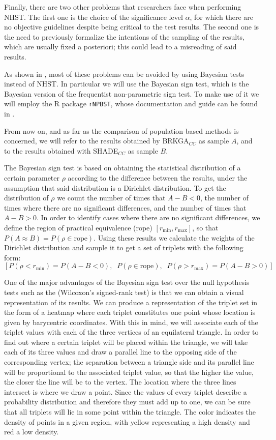 \documentclass[review]{elsarticle}
\begin{document}
Finally, there are two other problems that researchers face when performing NHST. The first one is the choice of the significance level $\alpha$, for which there are no objective guidelines despite being critical to the test results. The second one is the need to previously formalize the intentions of the sampling of the results, which are usually fixed a posteriori; this could lead to a misreading of said results.

As shown in \cite{benavoli2017time}, most of these problems can be avoided by using Bayesian tests instead of NHST. In particular we will use the Bayesian sign test, which is the Bayesian version of the frequentist non-parametric sign test. To make use of it we will employ the R package \texttt{rNPBST}, whose documentation and guide can be found in \cite{carrasco2017rnpbst}.

From now on, and as far as the comparison of population-based methods is concerned, we will refer to the results obtained by BRKGA$_{CC}$ as sample $A$, and to the results obtained with SHADE$_{CC}$ as sample $B$.

The Bayesian sign test is based on obtaining the statistical distribution of a certain parameter $\rho$ according to the difference between the results, under the assumption that said distribution is a Dirichlet distribution. To get the distribution of $\rho$ we count the number of times that $A - B < 0$, the number of times where there are no significant differences, and the number of times that $A - B > 0$. In order to identify cases where there are no significant differences, we define the region of practical equivalence (rope) $[r_\text{min}, r_\text{max}]$, so that $P(A \approx B) = P(\rho \in \text{rope})$. Using these results we calculate the weights of the Dirichlet distribution and sample it to get a set of triplets with the following form: 
$$[P(\rho < r_\text{min}) = P(A - B < 0),\;\; P(\rho \in \text{rope}),\;\; P(\rho > r_\text{max}) = P(A - B > 0)]$$

One of the major advantages of the Bayesian sign test over the null hypothesis tests such as the (Wilcoxon's signed-rank test) is that we can obtain a visual representation of its results. We can produce a representation of the triplet set in the form of a heatmap where each triplet constitutes one point whose location is given by barycentric coordinates. With this in mind, we will associate each of the triplet values with each of the three vertices of an equilateral triangle. In order to find out where a certain triplet will be placed within the triangle, we will take each of its three values and draw a parallel line to the opposing side of the corresponding vertex; the separation between a triangle side and its parallel line will be proportional to the associated triplet value, so that the higher the value, the closer the line will be to the vertex. The location where the three lines intersect is where we draw a point. Since the values of every triplet describe a probability distribution and therefore they must add up to one, we can be sure that all triplets will lie in some point within the triangle. The color indicates the density of points in a given region, with yellow representing a high density and red a low density.
\end{document}
